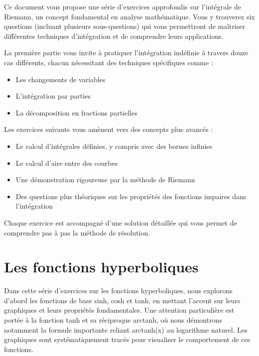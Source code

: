\documentclass[
  12pt,
  letterpaper,
]{book}
\providecommand{\tightlist}{%
  \setlength{\itemsep}{0pt}\setlength{\parskip}{0pt}}\usepackage{longtable,booktabs,array}
\theoremstyle{remark}
\begin{document}

Ce document vous propose une série d'exercices approfondis sur
l'intégrale de Riemann, un concept fondamental en analyse mathématique.
Vous y trouverez six questions (incluant plusieurs sous-questions) qui
vous permettront de maîtriser différentes techniques d'intégration et de
comprendre leurs applications.

La première partie vous invite à pratiquer l'intégration indéfinie à
travers douze cas différents, chacun nécessitant des techniques
spécifiques comme :

\begin{itemize}
\tightlist
\item
  Les changements de variables
\item
  L'intégration par parties
\item
  La décomposition en fractions partielles
\end{itemize}

Les exercices suivants vous amènent vers des concepts plus avancés :

\begin{itemize}
\tightlist
\item
  Le calcul d'intégrales définies, y compris avec des bornes infinies
\item
  Le calcul d'aire entre des courbes
\item
  Une démonstration rigoureuse par la méthode de Riemann
\item
  Des questions plus théoriques sur les propriétés des fonctions
  impaires dans l'intégration
\end{itemize}

Chaque exercice est accompagné d'une solution détaillée qui vous permet
de comprendre pas à pas la méthode de résolution.

\section*{Les fonctions
hyperboliques}\label{les-fonctions-hyperboliques}


Dans cette série d'exercices sur les fonctions hyperboliques, nous
explorons d'abord les fonctions de base sinh, cosh et tanh, en mettant
l'accent sur leurs graphiques et leurs propriétés fondamentales. Une
attention particulière est portée à la fonction tanh et sa réciproque
arctanh, où nous démontrons notamment la formule importante reliant
arctanh(x) au logarithme naturel. Les graphiques sont systématiquement
tracés pour visualiser le comportement de ces fonctions.
\end{document}
